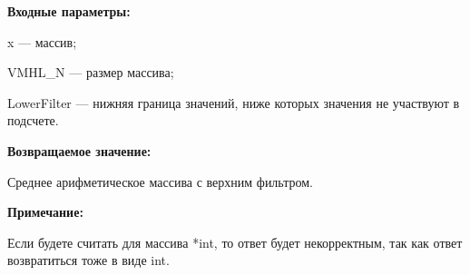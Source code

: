 \textbf{Входные параметры:}

 x --- массив;
 
 VMHL\_N --- размер массива;
 
 LowerFilter --- нижняя граница значений, ниже которых значения не участвуют в подсчете.

\textbf{Возвращаемое значение:}

 Среднее арифметическое массива с верхним фильтром.
 
\textbf{Примечание:}

Если будете считать для массива *int, то ответ будет некорректным, так как ответ возвратиться тоже в виде int.
 
